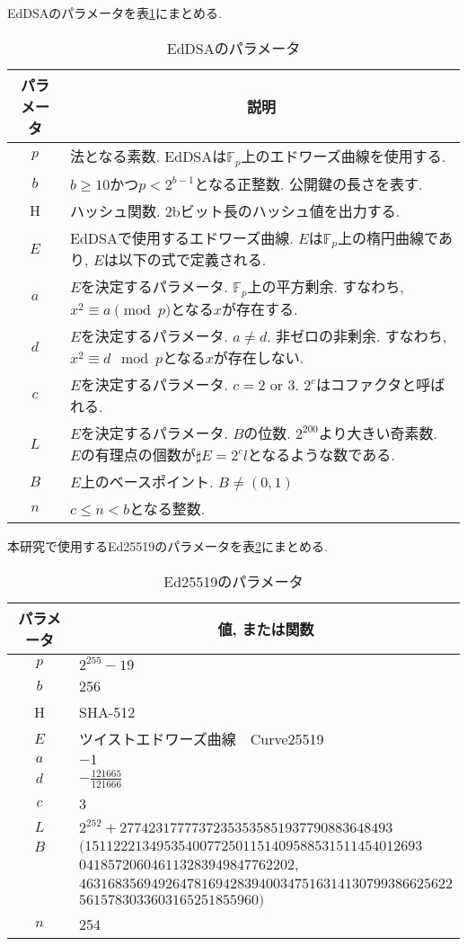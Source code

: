 EdDSAのパラメータを表\ref{tab:eddsa-parameters}にまとめる.\\
\captionsetup{font=normalsize} %
\begin{table}[htbp]
  \caption{EdDSAのパラメータ}
  \label{tab:eddsa-parameters}
  \centering
  \begin{tabular}{cp{10cm}}
    \hline
    \multicolumn{1}{c}{パラメータ} & \multicolumn{1}{c}{説明} \\ \hline \hline
    $p$ & 法となる素数. EdDSAは$\mathbb{F}_p$上のエドワーズ曲線を使用する.\\
    $b$ & $b\geq 10$かつ$p<2^{b-1}$となる正整数. 公開鍵の長さを表す.\\
    H & ハッシュ関数. 2bビット長のハッシュ値を出力する. \\
    $E$ & EdDSAで使用するエドワーズ曲線. $E$は$\mathbb{F}_p$上の楕円曲線であり, $E$は以下の式で定義される.\\
    $a$ & $E$を決定するパラメータ. $\mathbb{F}_p$上の平方剰余. すなわち, $x^2\equiv a \pmod{p}$となる$x$が存在する.\\
    $d$ & $E$を決定するパラメータ. $a\neq d$. 非ゼロの非剰余. すなわち, $x^2\equiv d \mod{p}$となる$x$が存在しない.\\
    $c$ & $E$を決定するパラメータ. $c=2$ or $3$. $2^{c}$はコファクタと呼ばれる.\\
    $L$ & $E$を決定するパラメータ. $B$の位数. $2^{200}$より大きい奇素数. $E$の有理点の個数が$\sharp E=2^{c}l$となるような数である.\\
    $B$ & $E$上のベースポイント. $B\neq (0,1)$\\
    $n$ & $c\leq n < b$となる整数.\\ \hline
  \end{tabular}
\end{table}

本研究で使用するEd25519のパラメータを表\ref{tab:ed25519-parameters}にまとめる.\\
\begin{longtable}{cl}
  \caption{Ed25519のパラメータ}
  \label{tab:ed25519-parameters}
  \endfirsthead
  \hline
  \multicolumn{1}{c}{パラメータ} & \multicolumn{1}{c}{値, または関数} \\ \hline \hline
  $p$ & $2^{255}-19$ \\
  $b$ & 256 \\
  H & SHA-512 \\
  $E$ & ツイストエドワーズ曲線　Curve25519 \\
  $a$ & $-1$ \\
  $d$ & $-\frac{121665}{121666}$ \\
  $c$ & 3 \\
  $L$ & $2^{252} + 27742317777372353535851937790883648493$ \\
  $B$ & $(15112221349535400772501151409588531511454012693$ \\
  & $041857206046113283949847762202,$\\
  & $4631683569492647816942839400347516314130799386625622$ \\
  & $5615783033603165251855960)$ \\
  $n$ & 254 \\ \hline
\end{longtable}

